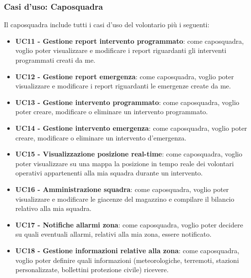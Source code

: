 \subsubsection{Casi d'uso: Caposquadra}
Il caposquadra include tutti i casi d'uso del volontario più i seguenti:
\begin{itemize}
	\item \textbf{UC11 - Gestione report intervento programmato}:
	come caposquadra, voglio poter visualizzare e modificare i report riguardanti gli interventi programmati creati da me.
	
	\item \textbf{UC12 - Gestione report emergenza}:
	come caposquadra, voglio poter visualizzare e modificare i report riguardanti le emergenze create da me.
	
	\item \textbf{UC13 - Gestione intervento programmato}:
	come caposquadra, voglio poter creare, modificare o eliminare un intervento programmato.
	
	\item \textbf{UC14 - Gestione intervento emergenza}:
	come caposquadra, voglio poter creare, modificare o eliminare un intervento d'emergenza.
	
	\item \textbf{UC15 - Visualizzazione posizione real-time}:
	come caposquadra, voglio poter visualizzare su una mappa la posizione in tempo reale dei volontari operativi appartenenti alla mia squadra durante un intervento.
	
	\item \textbf{UC16 - Amministrazione squadra}:
	come caposquadra, voglio poter visualizzare e modificare le giacenze del magazzino e compilare il bilancio relativo alla mia squadra.
	
	\item \textbf{UC17 - Notifiche allarmi zona}:
	come caposquadra, voglio poter decidere su quali eventuali allarmi, relativi alla mia zona, essere notificato.
	
	\item \textbf{UC18 - Gestione informazioni relative alla zona}:
	come caposquadra, voglio poter definire quali informazioni (meteorologiche, terremoti, stazioni personalizzate, bollettini protezione civile) ricevere.
\end{itemize}




